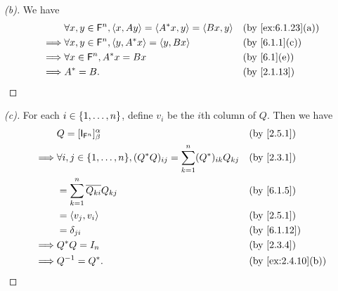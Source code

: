 \begin{proof}[(b)]
  We have
  \begin{align*}
             & \forall x, y \in \vs{F}^n, \inn{x, Ay} = \inn{A^* x, y} = \inn{Bx, y} &  & \text{(by \cref{ex:6.1.23}(a))} \\
    \implies & \forall x, y \in \vs{F}^n, \inn{y, A^* x} = \inn{y, Bx}               &  & \text{(by \cref{6.1.1}(c))}     \\
    \implies & \forall x \in \vs{F}^n, A^* x = Bx                                    &  & \text{(by \cref{6.1}(e))}       \\
    \implies & A^* = B.                                                              &  & \text{(by \cref{2.1.13})}
  \end{align*}
\end{proof}

\begin{proof}[(c)]
  For each \(i \in \left\lbrace1, \dots, n\right\rbrace\), define \(v_i\) be the \(i\)th column of \(Q\).
  Then we have
  \begin{align*}
             & Q = [\IT[\vs{F}^n]]_{\beta}^{\alpha}                                                   &  & \text{(by \cref{2.5.1})}        \\
    \implies & \forall i, j \in \set{1, \dots, n}, (Q^* Q)_{i j} = \sum_{k = 1}^n (Q^*)_{i k} Q_{k j} &  & \text{(by \cref{2.3.1})}        \\
             & = \sum_{k = 1}^n \conj{Q_{k i}} Q_{k j}                                                &  & \text{(by \cref{6.1.5})}        \\
             & = \inn{v_j, v_i}                                                                       &  & \text{(by \cref{2.5.1})}        \\
             & = \delta_{j i}                                                                         &  & \text{(by \cref{6.1.12})}       \\
    \implies & Q^* Q = I_n                                                                            &  & \text{(by \cref{2.3.4})}        \\
    \implies & Q^{-1} = Q^*.                                                                          &  & \text{(by \cref{ex:2.4.10}(b))}
  \end{align*}
\end{proof}

